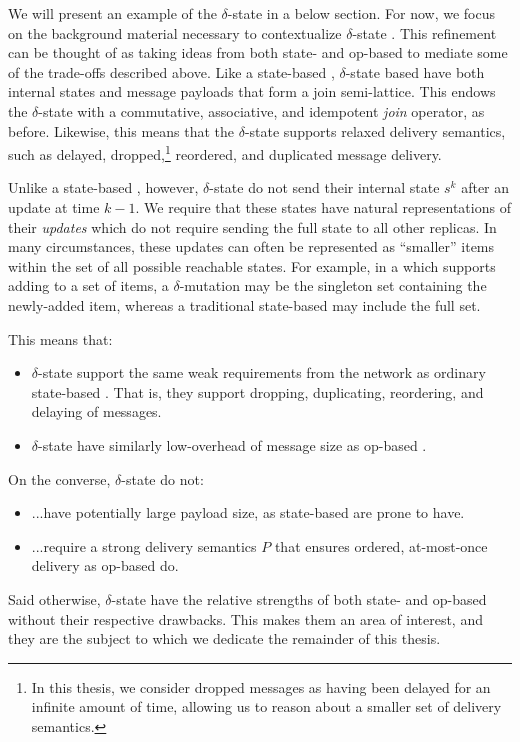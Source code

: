 We will present an example of the $\delta$-state \CRDT in a below section. For
now, we focus on the background material necessary to contextualize
$\delta$-state \CRDTs. This refinement can be thought of as taking ideas from
both state- and op-based \CRDTs to mediate some of the trade-offs described
above. Like a state-based \CRDT, $\delta$-state based \CRDTs have both internal
states and message payloads that form a join semi-lattice. This endows the
$\delta$-state \CRDT with a commutative, associative, and idempotent \emph{join}
operator, as before. Likewise, this means that the $\delta$-state \CRDT supports
relaxed delivery semantics, such as delayed, dropped,\footnote{In this thesis,
we consider dropped messages as having been delayed for an infinite amount of
time, allowing us to reason about a smaller set of delivery semantics.}
reordered, and duplicated message delivery.

Unlike a state-based \CRDT, however, $\delta$-state \CRDTs do not send their
internal state $s^k$ after an update at time $k-1$. We require that these states
have natural representations of their \emph{updates} which do not require
sending the full state to all other replicas. In many circumstances, these
updates can often be represented as ``smaller'' items within the set of all
possible reachable states. For example, in a \CRDT which supports adding to a
set of items, a $\delta$-mutation may be the singleton set containing the
newly-added item, whereas a traditional state-based \CRDT may include the full
set.

This means that:
\begin{itemize}
  \item $\delta$-state \CRDTs support the same weak requirements from the
    network as ordinary state-based \CRDTs. That is, they support dropping,
    duplicating, reordering, and delaying of messages.
  \item $\delta$-state \CRDTs have similarly low-overhead of message size as
    op-based \CRDTs.
\end{itemize}
On the converse, $\delta$-state \CRDTs do not:
\begin{itemize}
  \item ...have potentially large payload size, as state-based \CRDTs are prone
    to have.
  \item ...require a strong delivery semantics $P$ that ensures ordered,
    at-most-once delivery as op-based \CRDTs do.
\end{itemize}
Said otherwise, $\delta$-state \CRDTs have the relative strengths of both state-
and op-based \CRDTs without their respective drawbacks. This makes them an area
of interest, and they are the subject to which we dedicate the remainder of this
thesis.
